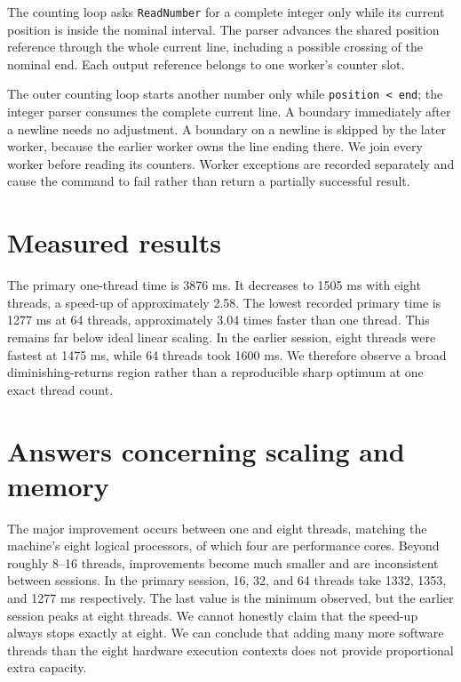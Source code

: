 
The counting loop asks \texttt{ReadNumber} for a complete integer only while its current position is inside the nominal interval. The parser advances the shared position reference through the whole current line, including a possible crossing of the nominal end. Each output reference belongs to one worker's counter slot.



The outer counting loop starts another number only while \texttt{position < end}; the integer parser consumes the complete current line. A boundary immediately after a newline needs no adjustment. A boundary on a newline is skipped by the later worker, because the earlier worker owns the line ending there. We join every worker before reading its counters. Worker exceptions are recorded separately and cause the command to fail rather than return a partially successful result.

\section{Measured results}


The primary one-thread time is 3876 ms. It decreases to 1505 ms with eight threads, a speed-up of approximately 2.58. The lowest recorded primary time is 1277 ms at 64 threads, approximately 3.04 times faster than one thread. This remains far below ideal linear scaling. In the earlier session, eight threads were fastest at 1475 ms, while 64 threads took 1600 ms. We therefore observe a broad diminishing-returns region rather than a reproducible sharp optimum at one exact thread count.

\section{Answers concerning scaling and memory}
The major improvement occurs between one and eight threads, matching the machine's eight logical processors, of which four are performance cores. Beyond roughly 8--16 threads, improvements become much smaller and are inconsistent between sessions. In the primary session, 16, 32, and 64 threads take 1332, 1353, and 1277 ms respectively. The last value is the minimum observed, but the earlier session peaks at eight threads. We cannot honestly claim that the speed-up always stops exactly at eight. We can conclude that adding many more software threads than the eight hardware execution contexts does not provide proportional extra capacity.

